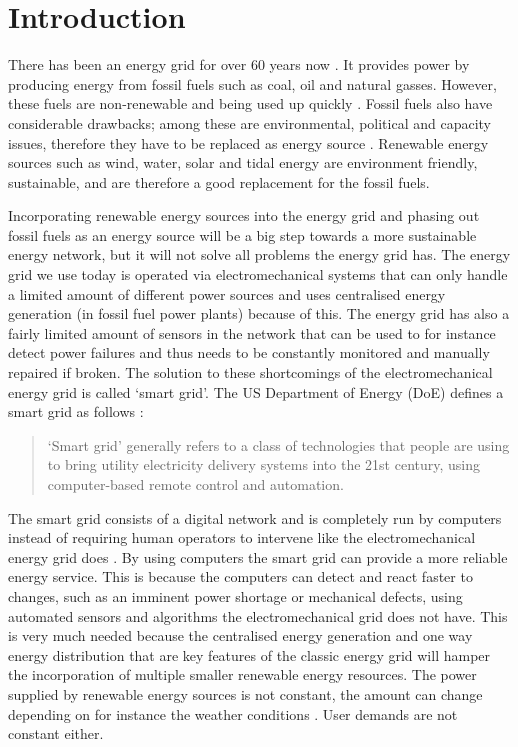 \section{Introduction}\label{intro}
There has been an energy grid for over 60 years now . It provides power by producing energy from fossil fuels such as coal, oil and natural gasses. However, these fuels are non-renewable and being used up quickly . Fossil fuels also have considerable drawbacks; among these are environmental, political and capacity issues, therefore they have to be replaced as energy source \cite{friedman2008hot}. Renewable energy sources such as wind, water, solar and tidal energy \cite{Tromly2001} are environment friendly, sustainable, and are therefore a good replacement for the fossil fuels.

Incorporating renewable energy sources into the energy grid and phasing out fossil fuels as an energy source will be a big step towards a more sustainable energy network, but it will not solve all problems the energy grid has. The energy grid we use today is operated via electromechanical systems that can only handle a limited amount of different power sources and uses centralised energy generation  (in fossil fuel power plants) because of this. The energy grid has also a fairly limited amount of sensors in the network that can be used to for instance detect power failures and thus needs to be constantly monitored and manually repaired  if broken. The solution to these shortcomings of the electromechanical energy grid is called `smart grid'. The US Department of Energy (DoE) defines a smart grid as follows \cite{doe}: 
 
\begin{quote}
`Smart grid' generally refers to a class of technologies that people are using to bring utility electricity delivery systems into the 21st century, using computer-based remote control and automation.
\end{quote}

The smart grid consists of a digital network and is completely run by computers instead of requiring human operators to intervene like the electromechanical energy grid does \cite{Moslehi2010}.  By using computers the smart grid can provide a more reliable energy service. This is because the computers can detect and react faster to changes, such as an imminent power shortage or mechanical defects, using automated sensors and algorithms the electromechanical grid does not have.  This is very much needed because the centralised energy generation and one way energy distribution that are key features of the classic energy grid will hamper the incorporation of multiple smaller renewable energy resources. The power supplied by renewable energy sources is not constant, the amount can change depending on for instance the weather conditions \cite{RamchurnVitelingumRogersJennings2014}. User demands are not constant either.

